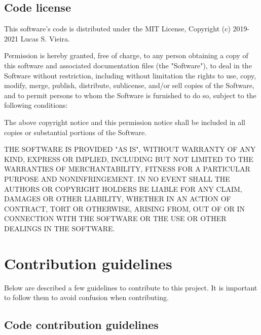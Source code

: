 \documentclass[openright,a4paper,twoside,12pt]{memoir}
\begin{document}
\subsection{Code license}
\label{sec:org492d9ec}

This software's code is distributed under the MIT License, Copyright
(c) 2019-2021 Lucas S. Vieira.

Permission is hereby granted, free of charge, to any person obtaining
a copy of this software and associated documentation files (the
"Software"), to deal in the Software without restriction, including
without limitation the rights to use, copy, modify, merge, publish,
distribute, sublicense, and/or sell copies of the Software, and to
permit persons to whom the Software is furnished to do so, subject
to the following conditions:

The above copyright notice and this permission notice shall be
included in all copies or substantial portions of the Software.

THE SOFTWARE IS PROVIDED "AS IS", WITHOUT WARRANTY OF ANY KIND,
EXPRESS OR IMPLIED, INCLUDING BUT NOT LIMITED TO THE WARRANTIES OF
MERCHANTABILITY, FITNESS FOR A PARTICULAR PURPOSE AND
NONINFRINGEMENT. IN NO EVENT SHALL THE AUTHORS OR COPYRIGHT HOLDERS
BE LIABLE FOR ANY CLAIM, DAMAGES OR OTHER LIABILITY, WHETHER IN AN
ACTION OF CONTRACT, TORT OR OTHERWISE, ARISING FROM, OUT OF OR IN
CONNECTION WITH THE SOFTWARE OR THE USE OR OTHER DEALINGS IN THE
SOFTWARE.

\section{Contribution guidelines}
\label{sec:org0f1de42}

Below are described a few guidelines to contribute to this project. It
is important to follow them to avoid confusion when contributing.

\subsection{Code contribution guidelines}
\label{sec:org751f534}
\end{document}
